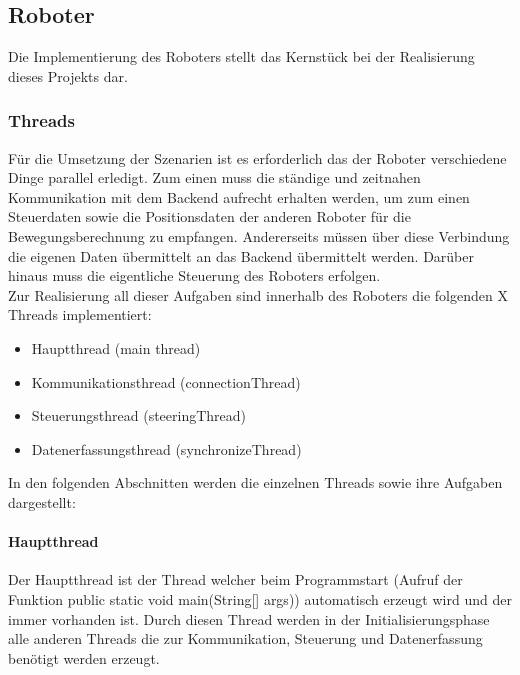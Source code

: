 \subsection{Roboter}
Die Implementierung des Roboters stellt das Kernstück bei der Realisierung dieses Projekts dar.\\

\subsubsection{Threads}
Für die Umsetzung der Szenarien ist es erforderlich das der Roboter verschiedene Dinge parallel erledigt. Zum einen muss die 
ständige und zeitnahen Kommunikation mit dem Backend aufrecht erhalten werden, um zum einen Steuerdaten sowie die Positionsdaten
der anderen Roboter für die Bewegungsberechnung zu empfangen. Andererseits müssen über diese Verbindung die eigenen Daten übermittelt
an das Backend übermittelt werden. Darüber hinaus muss die eigentliche Steuerung des Roboters erfolgen. \\
Zur Realisierung all dieser Aufgaben sind innerhalb des Roboters die folgenden X Threads implementiert:
\begin{itemize}
	\item{Hauptthread (main thread)}
	\item{Kommunikationsthread (connectionThread)}
	\item{Steuerungsthread (steeringThread)}
	\item{Datenerfassungsthread (synchronizeThread)}
\end{itemize}
In den folgenden Abschnitten werden die einzelnen Threads sowie ihre Aufgaben dargestellt:
\paragraph{Hauptthread}
Der Hauptthread ist der Thread welcher beim Programmstart (Aufruf der Funktion public static void main(String[] args)) automatisch 
erzeugt wird und der immer vorhanden ist. Durch diesen Thread werden in der Initialisierungsphase alle anderen Threads die 
zur Kommunikation, Steuerung und Datenerfassung benötigt werden erzeugt. 

